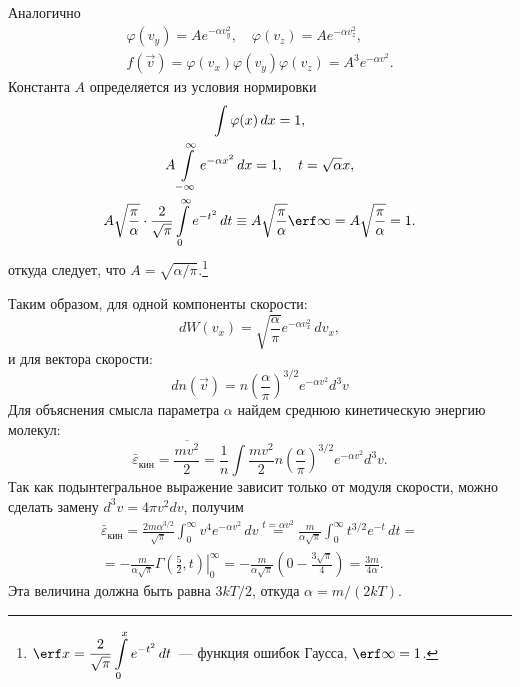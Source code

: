 Аналогично
\begin{gather*}
    \varphi(v_y) = A e^{-\alpha v_y^2}, \quad \varphi(v_z)=A e^{-\alpha v_z^2}, \\
    f(\vec{v}) = \varphi(v_x) \varphi(v_y) \varphi(v_z) = A^3 e^{-\alpha v^2}.
\end{gather*}
Константа $A$ определяется из условия нормировки 
\begin{gather*}
    \int \varphi(x) \, d x = 1,\\
    A \int\limits_{-\infty}^{\infty} e^{-\alpha x^2} \, dx = 1, \quad t = \sqrt{\alpha}{x},\\ 
    A \sqrt{\frac{\pi}{\alpha}} \cdot \frac{2}{\sqrt{\pi}} \int\limits_0^\infty e^{-t^2} \, dt \equiv  A \sqrt{\frac{\pi}{\alpha}} \erf \infty = A \sqrt{\frac{\pi}{\alpha}} = 1.
\end{gather*}
откуда следует, что $A = \sqrt{\alpha / \pi}$.\footnote{$\displaystyle \erf x = \frac{2}{\sqrt{\pi}} \int\limits_{0}^x e^{-t^2} \, dt$~--- функция ошибок Гаусса, $\erf \infty = 1$.}

Таким образом, для одной компоненты скорости:
\begin{equation*}
    d W(v_x) = \sqrt{\frac{\alpha}{\pi}} e^{-\alpha v_x^2} \, d v_x,
\end{equation*}
и для вектора скорости:
\begin{equation*}
    d n(\vec{v}) = n \left(\frac{\alpha}{\pi}\right)^{3 / 2} e^{-\alpha v^2} d^3 v
\end{equation*}
Для объяснения смысла параметра $\alpha$ найдем среднюю кинетическую энергию молекул:
\begin{equation*}
    \bar{\varepsilon}_{\text{кин}} 
    = \frac{\overline{m v^2}}{2}
    = \frac{1}{n} \int \frac{m v^2}{2} n\left(\frac{\alpha}{\pi}\right)^{3 / 2} e^{-\alpha v^2} d^3 v.
\end{equation*}
Так как подынтегральное выражение зависит только от модуля скорости, можно сделать замену  $d^3 v =  4 \pi v^2 d v$, получим
\begin{multline*}
    \bar{\varepsilon}_{\text{кин}}
        =  \frac{2m \alpha^{3 / 2}}{\sqrt{\pi}} \int_0^{\infty} v^4  e^{-\alpha v^2} \, d v 
        \overset{t = \alpha v^2}{=}  \frac{m}{\alpha \sqrt{\pi}} \int_0^{\infty} t^{3/2} e^{-t} \, dt = \\
        =  -\frac{m}{\alpha \sqrt{\pi}} \left.\Gamma \left(\frac{5}{2}, t\right) \right|_0^\infty 
        = -\frac{m}{\alpha \sqrt{\pi}} \left(0 - \frac{3 \sqrt{\pi}}{4} \right)
        = \frac{3 m}{4 \alpha}. 
\end{multline*}
Эта величина должна быть равна $3 k T / 2$, откуда $\alpha = m / (2 k T)$.

